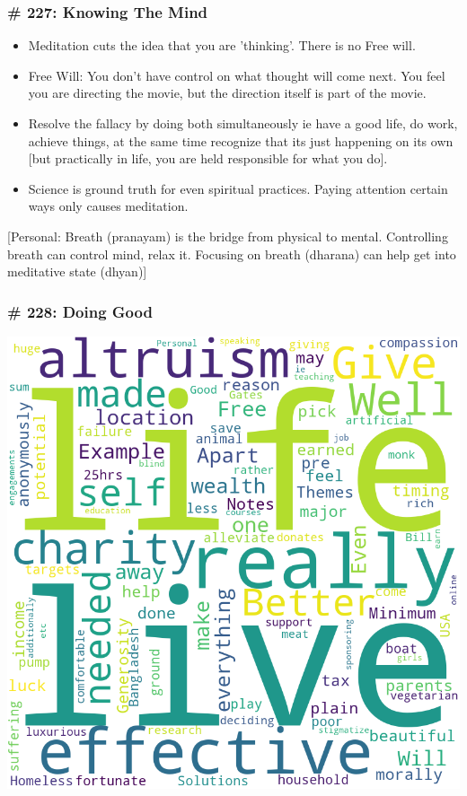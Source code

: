 \begin{frame}[fragile]
\frametitle{\# 227: Knowing The Mind}

\begin{itemize}
\item Meditation cuts the idea that you are 'thinking'. There is no Free will.
\item  Free Will: You don't have control on what thought will come next. You feel you are directing the movie, but the direction itself is part of the movie.
\item  Resolve the fallacy by doing both simultaneously ie have a good life, do work, achieve things, at the same time recognize that its just happening on its own [but practically in life, you are held responsible for what you do].
\item  Science is ground truth for even spiritual practices. Paying attention certain ways only causes meditation.
\end{itemize}

[Personal: Breath (pranayam) is the bridge from physical to mental. Controlling breath can control mind, relax it. Focusing on breath (dharana) can help get into meditative state (dhyan)]
\end{frame}

\begin{frame}[fragile]
\frametitle{\# 228: Doing Good}


 \begin{center}

\includegraphics[width=0.6\linewidth,keepaspectratio]{images/Review_Podcast_MakingSene_228_DoingGood}
\end{center}

\end{frame}

